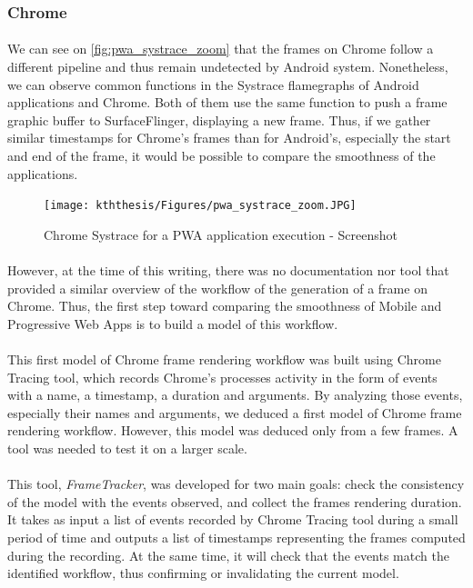 \documentclass{kththesis}
\begin{document}
\subsubsection{Chrome}

    \paragraph{}
    We can see on \autoref{fig:pwa_systrace_zoom} that the frames on Chrome follow a different pipeline and thus remain undetected by Android system. Nonetheless, we can observe common functions in the Systrace flamegraphs of Android applications and Chrome. Both of them use the same function to push a frame graphic buffer to SurfaceFlinger, displaying a new frame. Thus, if we gather similar timestamps for Chrome's frames than for Android's, especially the start and end of the frame, it would be possible to compare the smoothness of the applications.
    
    \begin{figure}[h]
        \centering
        \texttt{[image: kththesis/Figures/pwa\_systrace\_zoom.JPG]}
        \caption{Chrome Systrace for a PWA application execution - Screenshot}
        \label{fig:pwa_systrace_zoom}
    \end{figure}
    
    \paragraph{}
    However, at the time of this writing, there was no documentation nor tool that provided a similar overview of the workflow of the generation of a frame on Chrome. Thus, the first step toward comparing the smoothness of Mobile and Progressive Web Apps is to build a model of this workflow. 
    
    \paragraph{}
    This first model of Chrome frame rendering workflow was built using Chrome Tracing tool, which records Chrome's processes activity in the form of events with a name, a timestamp, a duration and arguments. By analyzing those events, especially their names and arguments, we deduced a first model of Chrome frame rendering workflow. However, this model was deduced only from a few frames. A tool was needed to test it on a larger scale. 
    
    \paragraph{}
    This tool, \textit{FrameTracker}, was developed for two main goals: check the consistency of the model with the events observed, and collect the frames rendering duration. It takes as input a list of events recorded by Chrome Tracing tool during a small period of time and outputs a list of timestamps representing the frames computed during the recording. At the same time, it will check that the events match the identified workflow, thus confirming or invalidating the current model. 
    
\end{document}
